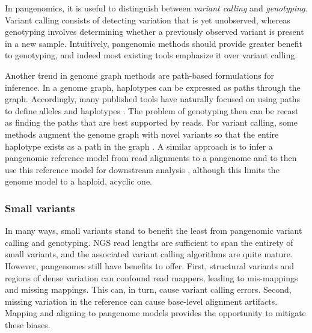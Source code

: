 In pangenomics, it is useful to distinguish between \emph{variant calling} and \emph{genotyping}.
Variant calling consists of detecting variation that is yet unobserved, whereas genotyping involves determining whether a previously observed variant is present in a new sample.
Intuitively, pangenomic methods should provide greater benefit to genotyping, and indeed most existing tools emphasize it over variant calling.

Another trend in genome graph methods are path-based formulations for inference.
In a genome graph, haplotypes can be expressed as paths through the graph.
Accordingly, many published tools have naturally focused on using paths to define alleles and haplotypes \cite{dilthey2015improved, sibbesen2018accurate,lee2018kourami,hickey2019genotyping,dolzhenko2019expansionhunter}.
The problem of genotyping then can be recast as finding the paths that are best supported by reads.
For variant calling, some methods augment the genome graph with novel variants so that the entire haplotype exists as a path in the graph \cite{sibbesen2018accurate,lee2018kourami,hickey2019genotyping}.
A similar approach is to infer a pangenomic reference model from read alignments to a pangenome and to then use this reference model for downstream analysis \cite{Maciuca_2016,Valenzuela_2018}, although this limits the genome model to a haploid, acyclic one.

\subsubsection{Small variants}

In many ways, small variants stand to benefit the least from pangenomic variant calling and genotyping.
NGS read lengths are sufficient to span the entirety of small variants, and the associated variant calling algorithms are quite mature.
However, pangenomes still have benefits to offer.
First, structural variants and regions of dense variation can confound read mappers, leading to mis-mappings and missing mappings.
This can, in turn, cause variant calling errors.
Second, missing variation in the reference can cause base-level alignment artifacts.
Mapping and aligning to pangenome models provides the opportunity to mitigate these biases.

